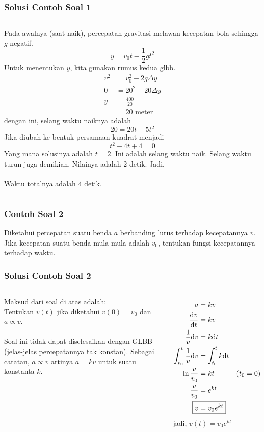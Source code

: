 \documentclass[10pt,aspectratio=54]{beamer}
\newcommand{\D}{\mathrm{d}}
\begin{document}
\begin{frame}
\frametitle{Solusi Contoh Soal 1}

\begin{columns}[c]
  
  
Pada awalnya (saat naik), percepatan gravitasi melawan kecepatan bola sehingga $g$ negatif.
$$y=v_0t-\frac{1}{2}gt^2$$
Untuk menentukan $y$, kita gunakan rumus kedua glbb.
\begin{align*}
v^2&=v_0^2 - 2g\Delta y \\
0&=20^2-20\Delta y \\
y&=\frac{400}{20} \\
&=20 \text{ meter}
\end{align*}
dengan ini, selang waktu naiknya adalah
$$20=20t-5t^2$$
Jika diubah ke bentuk persamaan kuadrat menjadi
$$t^2-4t+4=0$$
Yang mana solusinya adalah $t=2$. 
Ini adalah selang waktu naik. Selang waktu turun juga demikian. Nilainya adalah $2$ detik. Jadi,\\~\\
Waktu totalnya adalah $\boxed{4 \text{ detik}}$.
\end{columns}
\end{frame}

\begin{frame}
\frametitle{Contoh Soal 2}
Diketahui percepatan suatu benda $a$ berbanding lurus terhadap kecepatannya $v$. Jika kecepatan suatu benda mula-mula adalah $v_0$, tentukan fungsi kecepatannya terhadap waktu.
\end{frame}

\begin{frame}
\frametitle{Solusi Contoh Soal 2}


\begin{columns}[c]
  
  
  
Maksud dari soal di atas adalah:\\
Tentukan $v(t)$ jika diketahui $v(0)=v_0$ dan $a \propto v$.\\~\\
   
Soal ini tidak dapat diselesaikan dengan GLBB (jelas-jelas percepatannya tak konstan). Sebagai catatan, $a\propto v$ artinya $a=kv$ untuk suatu konstanta $k$.


  
  
\begin{align*}
 a &= kv &\\
 \frac{\D v}{\D t} &= kv &\\
 \frac{1}{v}\D v &= k\D t &\\
 \int_{v_0}^{v}{\frac{1}{v}\D v} &= \int_{t_0}^{t}{k\D t} &\\
 \ln \frac{v}{v_0} &= kt & (t_0=0) \\
 \frac{v}{v_0} &= e^{kt} &\\
 \Aboxed{v &= v_0 e^{kt}} &\\
\end{align*}
jadi, $v(t) = v_0 e^{kt}$
\end{columns}
\end{frame}
\end{document}

